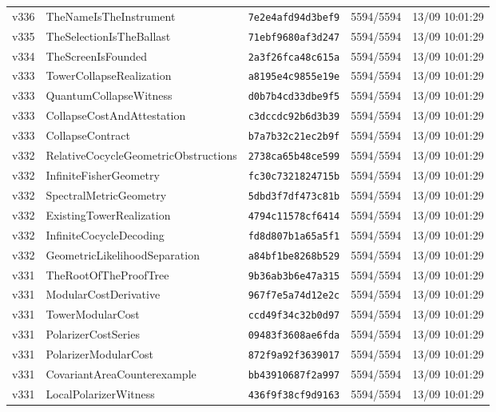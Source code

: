 \documentclass[11pt]{article}
\theoremstyle{definition}\newtheorem{deriv}{Derivação}
\begin{document}
{\begin{longtable}{@{}lllll@{}}
v336 & TheNameIsTheInstrument & \texttt{7e2e4afd94d3bef9} & 5594/5594 & 13/09 10:01:29 \\
v335 & TheSelectionIsTheBallast & \texttt{71ebf9680af3d247} & 5594/5594 & 13/09 10:01:29 \\
v334 & TheScreenIsFounded & \texttt{2a3f26fca48c615a} & 5594/5594 & 13/09 10:01:29 \\
v333 & TowerCollapseRealization & \texttt{a8195e4c9855e19e} & 5594/5594 & 13/09 10:01:29 \\
v333 & QuantumCollapseWitness & \texttt{d0b7b4cd33dbe9f5} & 5594/5594 & 13/09 10:01:29 \\
v333 & CollapseCostAndAttestation & \texttt{c3dccdc92b6d3b39} & 5594/5594 & 13/09 10:01:29 \\
v333 & CollapseContract & \texttt{b7a7b32c21ec2b9f} & 5594/5594 & 13/09 10:01:29 \\
v332 & RelativeCocycleGeometricObstructions & \texttt{2738ca65b48ce599} & 5594/5594 & 13/09 10:01:29 \\
v332 & InfiniteFisherGeometry & \texttt{fc30c7321824715b} & 5594/5594 & 13/09 10:01:29 \\
v332 & SpectralMetricGeometry & \texttt{5dbd3f7df473c81b} & 5594/5594 & 13/09 10:01:29 \\
v332 & ExistingTowerRealization & \texttt{4794c11578cf6414} & 5594/5594 & 13/09 10:01:29 \\
v332 & InfiniteCocycleDecoding & \texttt{fd8d807b1a65a5f1} & 5594/5594 & 13/09 10:01:29 \\
v332 & GeometricLikelihoodSeparation & \texttt{a84bf1be8268b529} & 5594/5594 & 13/09 10:01:29 \\
v331 & TheRootOfTheProofTree & \texttt{9b36ab3b6e47a315} & 5594/5594 & 13/09 10:01:29 \\
v331 & ModularCostDerivative & \texttt{967f7e5a74d12e2c} & 5594/5594 & 13/09 10:01:29 \\
v331 & TowerModularCost & \texttt{ccd49f34c32b0d97} & 5594/5594 & 13/09 10:01:29 \\
v331 & PolarizerCostSeries & \texttt{09483f3608ae6fda} & 5594/5594 & 13/09 10:01:29 \\
v331 & PolarizerModularCost & \texttt{872f9a92f3639017} & 5594/5594 & 13/09 10:01:29 \\
v331 & CovariantAreaCounterexample & \texttt{bb43910687f2a997} & 5594/5594 & 13/09 10:01:29 \\
v331 & LocalPolarizerWitness & \texttt{436f9f38cf9d9163} & 5594/5594 & 13/09 10:01:29 \\

\end{longtable}}
\end{document}
